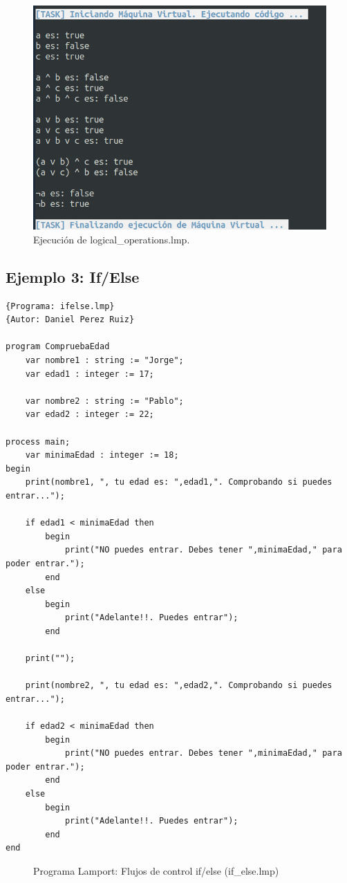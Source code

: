 \newpage
\begin{figure}[h]
    \includegraphics[width=\linewidth]{images/ejemplos/logical_operations.png}
    \caption{Ejecución de logical\_operations.lmp.}
    \label{fig:lamportLogicalOperations_exec}
\end{figure}

\newpage
\subsection{Ejemplo 3: If/Else}
\begin{lstlisting}[style=lamportStyle]
{Programa: ifelse.lmp}
{Autor: Daniel Perez Ruiz}

program CompruebaEdad
	var nombre1 : string := "Jorge";
	var edad1 : integer := 17;
	
	var nombre2 : string := "Pablo";
	var edad2 : integer := 22;
	
process main;
	var minimaEdad : integer := 18;
begin
	print(nombre1, ", tu edad es: ",edad1,". Comprobando si puedes entrar...");
	
	if edad1 < minimaEdad then
		begin
			print("NO puedes entrar. Debes tener ",minimaEdad," para poder entrar.");
		end
	else
		begin
			print("Adelante!!. Puedes entrar");
		end
		
	print("");
		
	print(nombre2, ", tu edad es: ",edad2,". Comprobando si puedes entrar...");
	
	if edad2 < minimaEdad then
		begin
			print("NO puedes entrar. Debes tener ",minimaEdad," para poder entrar.");
		end
	else
		begin
			print("Adelante!!. Puedes entrar");
		end
end
\end{lstlisting}
\begin{figure}[h]
\caption{Programa Lamport: Flujos de control if/else (if\_else.lmp)}
\label{fig:lamportIfElse}
\end{figure}

